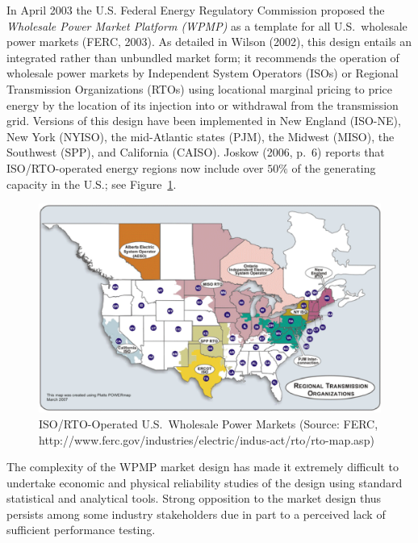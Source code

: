 \documentclass[12pt]{article}
\begin{document}
In April 2003 the U.S. Federal Energy Regulatory Commission
proposed the \textit{Wholesale Power Market Platform (WPMP)\/} 
as a template for all U.S.\ wholesale power markets (FERC, 2003).  As detailed in Wilson (2002), this 
design entails an integrated rather than unbundled market form; it recommends the operation of wholesale power markets  
by Independent System Operators (ISOs) or Regional Transmission 
Organizations (RTOs) using locational marginal pricing
to price energy by the location of its injection into or withdrawal from 
the transmission grid.  Versions of this design have been implemented 
in New England (ISO-NE), New York (NYISO), 
the mid-Atlantic states (PJM), the Midwest (MISO), the Southwest (SPP), and
California (CAISO).  Joskow (2006, p.~6) reports that ISO/RTO-operated energy regions 
now include over $50\%$ of the generating capacity in the U.S.; see Figure~\ref{fig:RTORegions}.


\begin{figure}[h]
	\centering
		\includegraphics[totalheight = 10cm]{RTORegionsMar2007.eps}
	\caption{ISO/RTO-Operated U.S.\ Wholesale Power Markets 
(Source: FERC, http://www.ferc.gov/industries/electric/indus-act/rto/rto-map.asp)}
	\label{fig:RTORegions}
\end{figure}


The complexity of the WPMP market design
has made it extremely difficult to undertake economic and
physical reliability studies of the design using standard
statistical and analytical tools.  Strong opposition to the market design
thus persists among some industry stakeholders due in part to a
perceived lack of sufficient performance testing.
\end{document}
